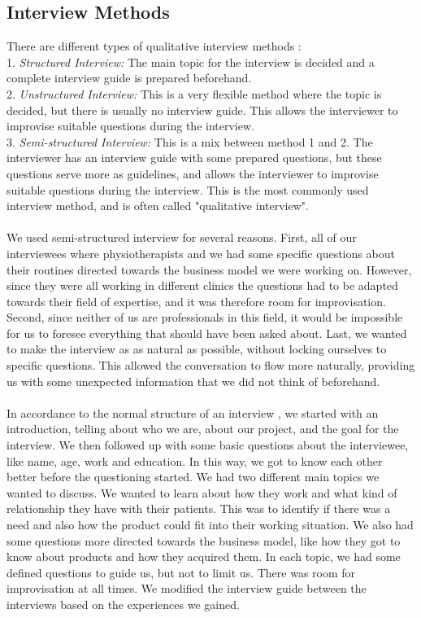 \subsection{Interview Methods}
There are different types of qualitative interview methods \cite{interview} \cite{interview2}: \\ 
1. \emph{Structured Interview:} The main topic for the interview is decided and a complete interview guide is prepared beforehand. \\ 
2. \emph{Unstructured Interview:} This is a very flexible method where the topic is decided, but there is usually no interview guide. This allows the interviewer to improvise suitable questions during the interview. \\ 
3. \emph{Semi-structured Interview:} This is a mix between method 1 and 2. The interviewer has an interview guide with some prepared questions, but these questions serve more as guidelines, and allows the interviewer to improvise suitable questions during the interview. This is the most commonly used interview method, and is often called "qualitative interview".  \\ \\
We used semi-structured interview for several reasons. First, all of our interviewees where physiotherapists and we had some specific questions about their routines directed towards the business model we were working on. However, since they were all working in different clinics the questions had to be adapted towards their field of expertise, and it was therefore room for improvisation. Second, since neither of us are professionals in this field, it would be impossible for us to foresee everything that should have been asked about. Last, we wanted to make the interview as as natural as possible, without locking ourselves to specific questions. This allowed the conversation to flow more naturally, providing us with some unexpected information that we did not think of beforehand. \\ \\
In accordance to the normal structure of an interview \cite{interview2}, we started with an introduction, telling about who we are, about our project, and the goal for the interview. We then followed up with some basic questions about the interviewee, like name, age, work and education. In this way, we got to know each other better before the questioning started. We had two different main topics we wanted to discuss. We wanted to learn about how they work and what kind of relationship they have with their patients. This was to identify if there was a need and also how the product could fit into their working situation. We also had some questions more directed towards the business model, like how they got to know about products and how they acquired them. In each topic, we had some defined questions to guide us, but not to limit us. There was room for improvisation at all times. We modified the interview guide between the interviews based on the experiences we gained.

